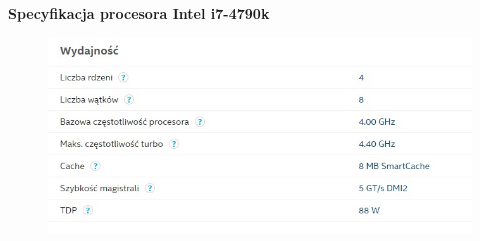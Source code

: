 \documentclass[document.tex]{subfiles}
\begin{document}
\clearpage

\textbf{\Large{Specyfikacja procesora Intel i7-4790k}}

\begin{figure}[h]
\includegraphics[scale=0.75]{imgs/intel_i74970k_spec.jpg}
\caption*{}
\label{fig:intel_i74970k}
\end{figure}
\end{document}
